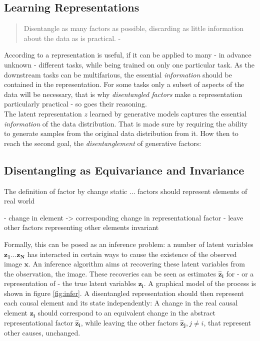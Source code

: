 	\subsection{Learning Representations}

	\begin{quote}
		{Disentangle as many factors as possible, discarding as little information about the data as is practical.} - \cite{bengio13rep} %
	\end{quote}

	According to \cite{bengio13rep} a representation is useful, if it can be applied to many - in advance unknown - different tasks, while being trained on only one particular task.
	As the downstream tasks can be multifarious, the essential \textit{information} should be contained in the representation.
	For some tasks only a subset of aspects of the data will be necessary, that is why \textit{disentangled factors} make a representation particularly practical - so goes their reasoning.\\
	The latent representation $z$ learned by generative models captures the essential \textit{information} of the data distribution. That is made sure by requiring the ability to generate samples from the original data distribution from it.
	How then to reach the second goal, the \textit{disentanglement} of generative factors:

	\subsection{Disentangling as Equivariance and Invariance}
		The
		definition of factor by change static ...
		factors should represent elements of real world

		- change in element -> corresponding change in representational factor
		- leave other factors representing other elements invariant

		Formally, this can be posed as an inference problem: a number of latent variables $\mathbf{z_1}\ldots\mathbf{z_N}$ has interacted in certain ways to cause the existence of the observed image $\mathbf{x}$. An inference algorithm aims at recovering these latent variables from the observation, \ie the image. These recoveries can be seen as estimates $\mathbf{\hat z_i}$ for - or a representation of - the true latent variables $\mathbf{z_i}$. A graphical model of the process is shown in figure \ref{fig:infer}.
		A disentangled representation should then represent each causal element and its state independently: A change in the real causal element $\mathbf{z_i}$ should correspond to an equivalent change in the abstract representational factor $\mathbf{\hat z_i}$, while leaving the other factors $\mathbf{\hat z_j}, j\neq i$, that represent other causes, unchanged.

